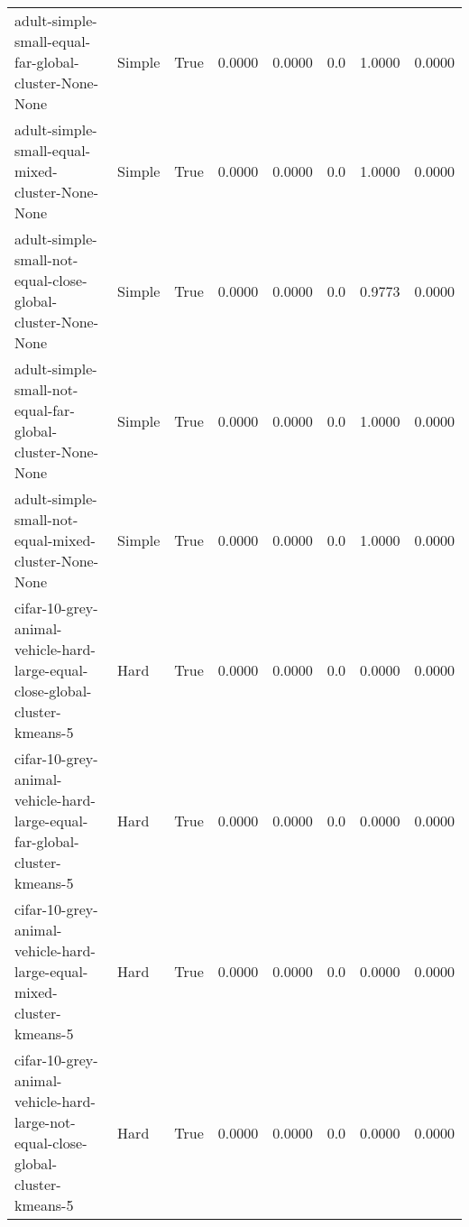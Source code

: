 \begin{tabular}{lllrrrrr}
                                  adult-simple-small-equal-far-global-cluster-None-None &       Simple &        True &                0.0000 &                0.0000 &                           0.0 &                        1.0000 &                        0.0000 \\
                                       adult-simple-small-equal-mixed-cluster-None-None &       Simple &        True &                0.0000 &                0.0000 &                           0.0 &                        1.0000 &                        0.0000 \\
                            adult-simple-small-not-equal-close-global-cluster-None-None &       Simple &        True &                0.0000 &                0.0000 &                           0.0 &                        0.9773 &                        0.0000 \\
                              adult-simple-small-not-equal-far-global-cluster-None-None &       Simple &        True &                0.0000 &                0.0000 &                           0.0 &                        1.0000 &                        0.0000 \\
                                   adult-simple-small-not-equal-mixed-cluster-None-None &       Simple &        True &                0.0000 &                0.0000 &                           0.0 &                        1.0000 &                        0.0000 \\
            cifar-10-grey-animal-vehicle-hard-large-equal-close-global-cluster-kmeans-5 &         Hard &        True &                0.0000 &                0.0000 &                           0.0 &                        0.0000 &                        0.0000 \\
              cifar-10-grey-animal-vehicle-hard-large-equal-far-global-cluster-kmeans-5 &         Hard &        True &                0.0000 &                0.0000 &                           0.0 &                        0.0000 &                        0.0000 \\
                   cifar-10-grey-animal-vehicle-hard-large-equal-mixed-cluster-kmeans-5 &         Hard &        True &                0.0000 &                0.0000 &                           0.0 &                        0.0000 &                        0.0000 \\
        cifar-10-grey-animal-vehicle-hard-large-not-equal-close-global-cluster-kmeans-5 &         Hard &        True &                0.0000 &                0.0000 &                           0.0 &                        0.0000 &                        0.0000 \\

\end{tabular}

